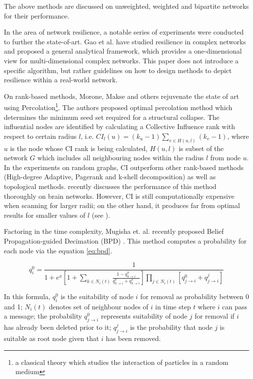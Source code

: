 	The above methods are discussed on unweighted, weighted and bipartite networks for their performance.
	
	In the area of network resilience, a notable series of experiments were conducted to further the state-of-art. Gao \cite{gao2016} et al. have studied resilience in complex networks and proposed a general analytical framework, which provides a one-dimensional view for multi-dimensional complex networks. This paper does not introduce a specific algorithm, but rather guidelines on how to design methods to depict resilience within a real-world network. 
	
	On rank-based methods, Morone, Makse and others \cite{morone2015} rejuvenate the state of art using Percolation\footnote{a classical theory which studies the interaction of particles in a random medium\cite{shante1971}}. The authors proposed optimal percolation method which determines the minimum seed set required for a structural collapse. The influential nodes are identified by calculating a Collective Influence rank with respect to certain radius $l$, i.e. $CI_l(u)=(k_u-1)\sum_{v\in H(u,l)}(k_v-1)$, where $u$ is the node whose CI rank is being calculated, $H(u,l)$ is subset of the network $G$ which includes all neighbouring nodes within the radius $l$ from node $u$. In the experiments on random graphs, CI outperform other rank-based methods (High-degree Adaptive, Pagerank and k-shell decomposition) as well as topological methods. \cite{pei2018} recently discusses the performance of this method thoroughly on brain networks. However, CI is still computationally expensive when scanning for larger radii; on the other hand, it produces far from optimal results for smaller values of $l$ (see \cite{clusella2016}).
	
	Factoring in the time complexity, Mugisha et. al. recently proposed Belief Propagation-guided Decimation (BPD) \cite{mugisha2016}. This method computes a probability for each node via the equation \ref{eq:bpd}.
	
	\begin{equation}
		\label{eq:bpd}
		q_i^0 = \frac{1}{1+e^x \left[1+\sum\limits_{k\in N_i(t)} \frac{1-q_{k\rightarrow i}^0}{q_{k\rightarrow i}^0 + q_{k\rightarrow i}^k} \right] \prod\limits_{j\in N_i(t)} [q_{j\rightarrow i}^0 + q_{j\rightarrow i}^j]}
	\end{equation}
	
	In this formula, $q_i^0$ is the suitability of node $i$ for removal as probability between 0 and 1; $N_i(t)$ denotes set of neighbour nodes of $i$ in time step $t$ where $i$ can pass a message; the probability $q_{j\rightarrow i}^0$ represents suitability of node $j$ for removal if $i$ has already been deleted prior to it; $q_{j\rightarrow i}^j$ is the probability that node $j$ is suitable as root node given that $i$ has been removed.
	
